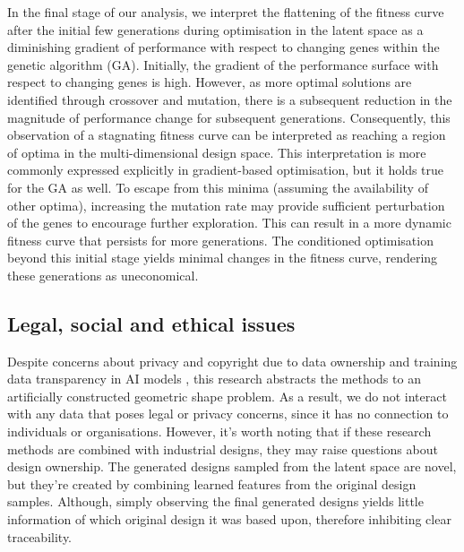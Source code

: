 \documentclass{article}
\begin{document}
In the final stage of our analysis, we interpret the flattening of the fitness curve after the initial few generations during optimisation in the latent space as a diminishing gradient of performance with respect to changing genes within the genetic algorithm (GA). Initially, the gradient of the performance surface with respect to changing genes is high. However, as more optimal solutions are identified through crossover and mutation, there is a subsequent reduction in the magnitude of performance change for subsequent generations. Consequently, this observation of a stagnating fitness curve can be interpreted as reaching a region of optima in the multi-dimensional design space. This interpretation is more commonly expressed explicitly in gradient-based optimisation, but it holds true for the GA as well. To escape from this minima (assuming the availability of other optima), increasing the mutation rate may provide sufficient perturbation of the genes to encourage further exploration. This can result in a more dynamic fitness curve that persists for more generations. The conditioned optimisation beyond this initial stage yields minimal changes in the fitness curve, rendering these generations as uneconomical. 

\subsection{Legal, social and ethical issues}
Despite concerns about privacy and copyright due to data ownership and training data transparency in AI models \citep{Oseni2021}, this research abstracts the methods to an artificially constructed geometric shape problem. As a result, we do not interact with any data that poses legal or privacy concerns, since it has no connection to individuals or organisations. However, it’s worth noting that if these research methods are combined with industrial designs, they may raise questions about design ownership. The generated designs sampled from the latent space are novel, but they’re created by combining learned features from the original design samples. Although, simply observing the final generated designs yields little information of which original design it was based upon, therefore inhibiting clear traceability.
\end{document}
